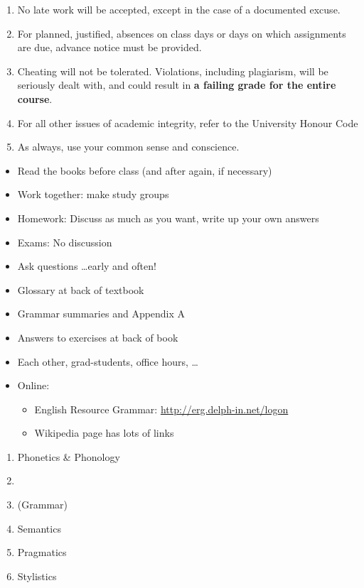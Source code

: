 \documentclass[a4paper,landscape,headrule,footrule]{foils}
\begin{document}
\begin{enumerate}
\item No late work will be accepted, except in the case of a documented excuse.
\item For planned, justified, absences on class days or days on which assignments are due, advance notice must be provided.
\item Cheating will not be tolerated. Violations, including plagiarism, will be seriously dealt with, and could result in \textbf{a failing grade for the entire course}.
\item For all other issues of academic integrity, refer to the University Honour Code
\item As always, use your common sense and conscience.
\end{enumerate}



\begin{itemize}
\item Read the books before class (and after again, if necessary)
\item Work together: make study groups
\item Homework: Discuss as much as you want, write up your own answers
\item Exams: No discussion
\item Ask questions \ldots  early and often!
\end{itemize}

\begin{itemize}
\item Glossary at back of textbook
\item Grammar summaries and Appendix A
\item Answers to exercises at back of book
\item Each other, grad-students,  office hours, \ldots
\item Online:
  \begin{itemize}
  \item English Resource Grammar: \url{http://erg.delph-in.net/logon}
  \item Wikipedia page has lots of links
  \end{itemize}
\end{itemize}

\begin{enumerate}\addtolength{\itemsep}{-0.75ex}
\item Phonetics \& Phonology
\item {}
\item {} (Grammar)
\item Semantics 
\item Pragmatics
\item Stylistics
\end{enumerate}
\end{document}
